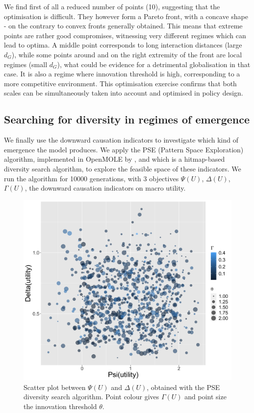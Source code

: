 \documentclass[letterpaper]{article}
\begin{document}
We find first of all a reduced number of points (10), suggesting that the optimisation is difficult. They however form a Pareto front, with a concave shape - on the contrary to convex fronts generally obtained. This means that extreme points are rather good compromises, witnessing very different regimes which can lead to optima. A middle point corresponds to long interaction distances (large $d_G$), while some points around and on the right extremity of the front are local regimes (small $d_G$), what could be evidence for a detrimental globalisation in that case. It is also a regime where innovation threshold is high, corresponding to a more competitive environment. This optimisation exercise confirms that both scales can be simultaneously taken into account and optimised in policy design.


\subsection{Searching for diversity in regimes of emergence}


We finally use the downward causation indicators to investigate which kind of emergence the model produces. We apply the PSE (Pattern Space Exploration) algorithm, implemented in OpenMOLE by \cite{cherel2015beyond}, and which is a hitmap-based diversity search algorithm, to explore the feasible space of these indicators. We run the algorithm for 10000 generations, with 3 objectives $\Psi (U)$, $\Delta (U)$, $\Gamma (U)$, the downward causation indicators on macro utility.


\begin{figure}[h!]
    \centering
    \includegraphics[width=\linewidth]{figures/pse-psi-delta-utility_colorGamma_sizetheta.png}
    \caption{Scatter plot between $\Psi (U)$ and $\Delta (U)$, obtained with the PSE diversity search algorithm. Point colour gives $\Gamma (U)$ and point size the innovation threshold $\theta$.\label{fig:pse}}
\end{figure}
\end{document}
